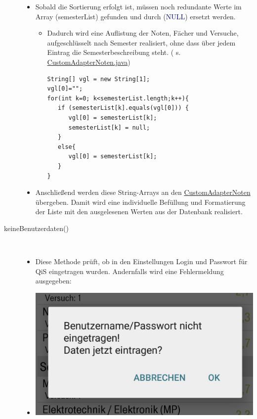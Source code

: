 \begin{description}
\begin{itemize}
\item Sobald die Sortierung erfolgt ist, müssen noch redundante Werte im Array (\textcolor{lila}{semesterList}) gefunden und durch (\textcolor{darkblue}{NULL}) ersetzt werden.
\begin{itemize}
\item Dadurch wird eine Auflistung der Noten, Fächer und Versuche, aufgeschlüsselt nach Semester realisiert, ohne dass über jedem Eintrag die Semesterbeschreibung steht. ( s. \hyperref[CustomAdapterNoten]{CustomAdapterNoten.java})
\begin{lstlisting}
String[] vgl = new String[1];
vgl[0]="";
for(int k=0; k<semesterList.length;k++){
   if (semesterList[k].equals(vgl[0])) {
      vgl[0] = semesterList[k];
      semesterList[k] = null;
   }
   else{
      vgl[0] = semesterList[k];
   }
}
\end{lstlisting}
\end{itemize}

\item Anschließend werden diese String-Arrays an den \hyperref[CustomAdapterNoten]{CustomAdapterNoten} übergeben. Damit wird eine individuelle Befüllung und Formatierung der Liste mit den ausgelesenen Werten aus der Datenbank realisiert.
\end{itemize} 
\item[keineBenutzerdaten()]~\par
\begin{itemize}
\item Diese Methode prüft, ob in den Einstellungen Login und Passwort für QiS eingetragen wurden. Andernfalls wird eine Fehlermeldung ausgegeben:
\item[] \includegraphics[scale=0.5]{05_Handbuch/img/Benutzerdaten.jpg}
\end{itemize}
 

\end{description}
